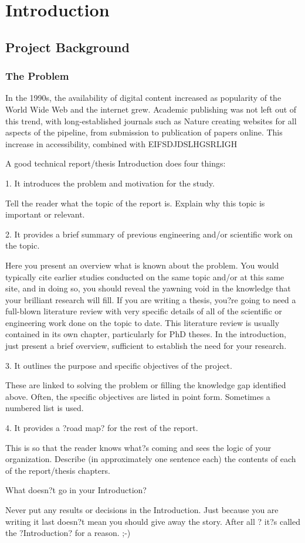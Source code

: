 \documentclass[Report.tex]{subfiles}
\begin{document}
\chapter{Introduction}
\section{Project Background}
\subsection{The Problem}
In the 1990s, the availability of digital content increased as popularity of the World Wide Web and the internet grew. Academic publishing was not left out of this trend, with long-established journals such as Nature creating websites for all aspects of the pipeline, from submission to publication of papers online\cite{nature-history}. This increase in accessibility, combined with  EIFSDJDSLHGSRLIGH

A good technical report/thesis Introduction does four things:

1.       It introduces the problem and motivation for the study.

    Tell the reader what the topic of the report is.
    Explain why this topic is important or relevant.

2.       It provides a brief summary of previous engineering and/or scientific work on the topic.

    Here you present an overview what is known about the problem.  You would typically cite earlier studies conducted on the same topic and/or at this same site, and in doing so, you should reveal the yawning void in the knowledge that your brilliant research will fill.
    If you are writing a thesis, you?re going to need a full-blown literature review with very specific details of all of the scientific or engineering work done on the topic to date.  This literature review is usually contained in its own chapter, particularly for PhD theses.  In the introduction, just present a brief overview, sufficient to establish the need for your research.

3.       It outlines the purpose and specific objectives of the project.

    These are linked to solving the problem or filling the knowledge gap identified above.
    Often, the specific objectives are listed in point form. Sometimes a numbered list is used.

4.       It provides a ?road map? for the rest of the report.

    This is so that the reader knows what?s coming and sees the logic of your organization.
    Describe (in approximately one sentence each) the contents of each of the report/thesis chapters.

What doesn?t go in your Introduction?

    Never put any results or decisions in the Introduction.  Just because you are writing it last doesn?t mean you should give away the story. After all ? it?s called the ?Introduction? for a reason. ;-)
\end{document}
